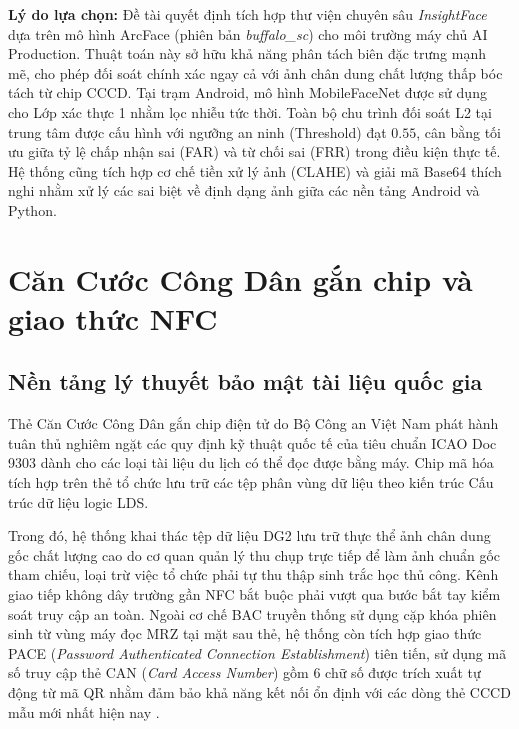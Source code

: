 \documentclass[../DoAn.tex]{subfiles}
\begin{document}
\textbf{Lý do lựa chọn:} Đề tài quyết định tích hợp thư viện chuyên sâu \textit{InsightFace} dựa trên mô hình ArcFace (phiên bản \textit{buffalo\_sc}) cho môi trường máy chủ AI Production. Thuật toán này sở hữu khả năng phân tách biên đặc trưng mạnh mẽ, cho phép đối soát chính xác ngay cả với ảnh chân dung chất lượng thấp bóc tách từ chip CCCD. Tại trạm Android, mô hình MobileFaceNet được sử dụng cho Lớp xác thực 1 nhằm lọc nhiễu tức thời. Toàn bộ chu trình đối soát L2 tại trung tâm được cấu hình với ngưỡng an ninh (Threshold) đạt $0.55$, cân bằng tối ưu giữa tỷ lệ chấp nhận sai (FAR) và từ chối sai (FRR) trong điều kiện thực tế. Hệ thống cũng tích hợp cơ chế tiền xử lý ảnh (CLAHE) và giải mã Base64 thích nghi nhằm xử lý các sai biệt về định dạng ảnh giữa các nền tảng Android và Python.

\clearpage %

\section{Căn Cước Công Dân gắn chip và giao thức NFC}
\label{section:3.2}

\subsection{Nền tảng lý thuyết bảo mật tài liệu quốc gia}

Thẻ Căn Cước Công Dân gắn chip điện tử do Bộ Công an Việt Nam phát hành tuân thủ nghiêm ngặt các quy định kỹ thuật quốc tế của tiêu chuẩn ICAO Doc 9303 \cite{icao9303} dành cho các loại tài liệu du lịch có thể đọc được bằng máy. Chip mã hóa tích hợp trên thẻ tổ chức lưu trữ các tệp phân vùng dữ liệu theo kiến trúc Cấu trúc dữ liệu logic LDS. 

Trong đó, hệ thống khai thác tệp dữ liệu DG2 lưu trữ thực thể ảnh chân dung gốc chất lượng cao do cơ quan quản lý thu chụp trực tiếp để làm ảnh chuẩn gốc tham chiếu, loại trừ việc tổ chức phải tự thu thập sinh trắc học thủ công. Kênh giao tiếp không dây trường gần NFC bắt buộc phải vượt qua bước bắt tay kiểm soát truy cập an toàn. Ngoài cơ chế BAC truyền thống sử dụng cặp khóa phiên sinh từ vùng máy đọc MRZ tại mặt sau thẻ, hệ thống còn tích hợp giao thức PACE (\textit{Password Authenticated Connection Establishment}) tiên tiến, sử dụng mã số truy cập thẻ CAN (\textit{Card Access Number}) gồm 6 chữ số được trích xuất tự động từ mã QR nhằm đảm bảo khả năng kết nối ổn định với các dòng thẻ CCCD mẫu mới nhất hiện nay \cite{icao9303}.
\end{document}
